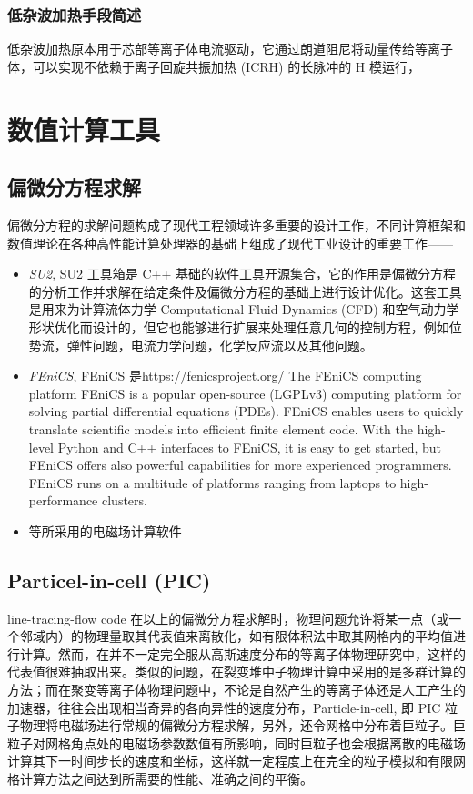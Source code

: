 \subsubsection{低杂波加热手段简述}
低杂波加热原本用于芯部等离子体电流驱动，它通过朗道阻尼将动量传给等离子体，可以实现不依赖于离子回旋共振加热 (ICRH) 的长脉冲的 H 模运行，



\section{数值计算工具}
\subsection{偏微分方程求解}
偏微分方程的求解问题构成了现代工程领域许多重要的设计工作，不同计算框架和数值理论在各种高性能计算处理器的基础上组成了现代工业设计的重要工作——

\begin{itemize}
    \item \textit{SU2}, SU2 工具箱是 C++ 基础的软件工具开源集合，它的作用是偏微分方程的分析工作并求解在给定条件及偏微分方程的基础上进行设计优化。这套工具是用来为计算流体力学 Computational Fluid Dynamics (CFD) 和空气动力学形状优化而设计的，但它也能够进行扩展来处理任意几何的控制方程，例如位势流，弹性问题，电流力学问题，化学反应流以及其他问题。
    \item \textit{FEniCS}, FEniCS 是https://fenicsproject.org/ 
    The FEniCS computing platform
    FEniCS is a popular open-source (LGPLv3) computing platform for solving partial differential equations (PDEs). FEniCS enables users to quickly translate scientific models into efficient finite element code. With the high-level Python and C++ interfaces to FEniCS, it is easy to get started, but FEniCS offers also powerful capabilities for more experienced programmers. FEniCS runs on a multitude of platforms ranging from laptops to high-performance clusters.
    \item 等所采用的电磁场计算软件
\end{itemize}


\subsection{Particel-in-cell (PIC)}
line-tracing-flow code
在以上的偏微分方程求解时，物理问题允许将某一点（或一个邻域内）的物理量取其代表值来离散化，如有限体积法中取其网格内的平均值进行计算。然而，在并不一定完全服从高斯速度分布的等离子体物理研究中，这样的代表值很难抽取出来。类似的问题，在裂变堆中子物理计算中采用的是多群计算的方法；而在聚变等离子体物理问题中，不论是自然产生的等离子体还是人工产生的加速器，往往会出现相当奇异的各向异性的速度分布，Particle-in-cell, 即 PIC 粒子物理将电磁场进行常规的偏微分方程求解，另外，还令网格中分布着巨粒子。巨粒子对网格角点处的电磁场参数数值有所影响，同时巨粒子也会根据离散的电磁场计算其下一时间步长的速度和坐标，这样就一定程度上在完全的粒子模拟和有限网格计算方法之间达到所需要的性能、准确之间的平衡。

